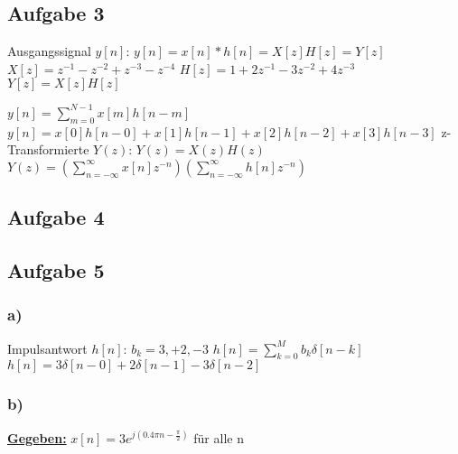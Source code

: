 \documentclass[12pt]{scrreprt}
\begin{document}
\subsection*{Aufgabe 3}
Ausgangssignal $y[n]$:\newline
\hspace*{5mm}$y[n]=x[n]*h[n] = X[z]H[z] = Y[z]$\newline
\hspace*{5mm}$X[z]=z^{-1} - z^{-2} + z^{-3} - z^{-4}$\newline
\hspace*{5mm}$H[z]=1 + 2z^{-1} - 3z^{-2} + 4z^{-3}$\newline
\hspace*{5mm}$Y[z]=X[z]H[z]$


\hspace*{5mm}$y[n]=\sum_{m=0}^{N-1}x[m]h[n-m]$\newline
\hspace*{5mm}$y[n]=x[0]h[n-0]+x[1]h[n-1]+x[2]h[n-2]+x[3]h[n-3]$\newline
\newpage
z-Transformierte $Y(z)$:\newline
\hspace*{5mm}$Y(z)=X(z)H(z)$\newline
\hspace*{5mm}$Y(z)=(\sum_{n=-\infty}^{\infty}x[n]z^{-n})(\sum_{n=-\infty}^{\infty}h[n]z^{-n})$

\subsection*{Aufgabe 4}

\subsection*{Aufgabe 5}
\subsubsection*{a)}
Impulsantwort $h[n]$:\newline
\hspace*{5mm}$b_k={3, +2, -3}$\newline
\hspace*{5mm}$h[n]=\sum_{k=0}^{M}b_k\delta[n-k]$\newline
\hspace*{5mm}$h[n]=3\delta[n-0] + 2\delta[n-1] - 3\delta[n-2]$\newline

\subsubsection*{b)}
\underline{\textbf{Gegeben:}}\newline
\hspace*{5mm}$x[n]=3e^{j(0.4\pi n - \frac{\pi}{2})}$ für alle n\newline
\hspace*{5mm}
\end{document}
